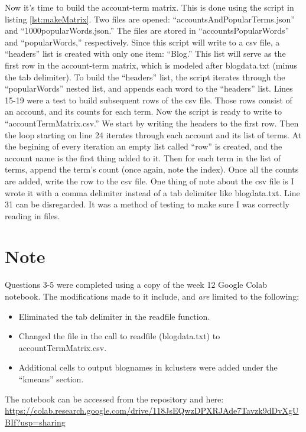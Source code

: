 \documentclass[12pt]{article}
\begin{document}
Now it's time to build the account-term matrix.  This is done using the script in listing \ref{lst:makeMatrix}.  Two files are opened: ``accountsAndPopularTerms.json'' and ``1000popularWords.json.''  The files are stored in ``accountsPopularWords'' and ``popularWords,'' respectively.  Since this script will write to a csv file, a ``headers'' list is created with only one item: ``Blog.''  This list will serve as the first row in the account-term matrix, which is modeled after blogdata.txt (minus the tab delimiter).  To build the ``headers'' list, the script iterates through the ``popularWords'' nested list, and appends each word to the ``headers'' list.  Lines 15-19 were a test to build subsequent rows of the csv file.  Those rows consist of an account, and its counts for each term.  Now the script is ready to write to ``accountTermMatrix.csv.''  We start by writing the headers to the first row.  Then the loop starting on line 24 iterates through each account and its list of terms.  At the begining of every iteration an empty list called ``row'' is created, and the account name is the first thing added to it.  Then for each term in the list of terms, append the term's count (once again, note the index).  Once all the counts are added, write the row to the csv file.  One thing of note about the csv file is I wrote it with a comma delimiter instead of a tab delimiter like blogdata.txt.  Line 31 can be disregarded.  It was a method of testing to make sure I was correctly reading in files.

\section*{Note}
Questions 3-5 were completed using a copy of the week 12 Google Colab notebook.  The modifications made to it include, and \emph{are} limited to the following:
\begin{itemize}
    \item Eliminated the tab delimiter in the readfile function.
    \item Changed the file in the call to readfile (blogdata.txt) to accountTermMatrix.csv.
    \item Additional cells to output blognames in kclusters were added under the ``kmeans'' section.
\end{itemize}

The notebook can be accessed from the repository and here: \url{https://colab.research.google.com/drive/118JsEQwzDPXRJAde7Tavzk9dDvXgUBIf?usp=sharing}
\end{document}
